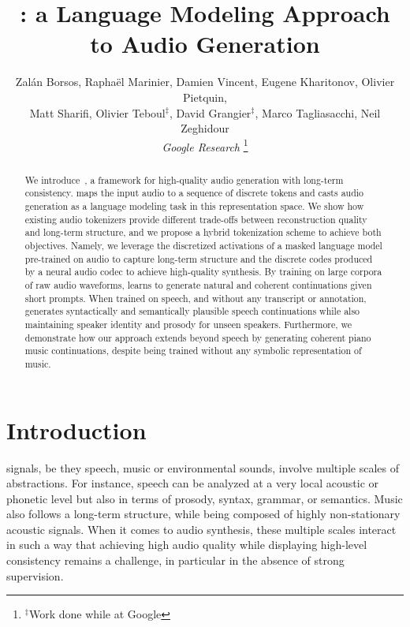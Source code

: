 \documentclass[letterpaper,10 pt]{IEEEtran}
\begin{document}
\title{\ours{}: a Language Modeling Approach to Audio Generation}

\author{Zal\'an Borsos, Rapha\"el Marinier, Damien Vincent, Eugene Kharitonov, Olivier Pietquin,\\Matt Sharifi, Olivier Teboul$^\ddagger$, David Grangier$^\ddagger$, Marco Tagliasacchi, Neil Zeghidour\\
\vspace{3mm}\textit{Google Research}
\thanks{$^\ddagger$Work done while at Google}}


\maketitle

\begin{abstract}
We introduce~\ours{}, a framework for high-quality audio generation with long-term consistency. \ours{} maps the input audio to a sequence of discrete tokens and casts audio generation as a language modeling task in this representation space. We show how existing audio tokenizers provide different trade-offs between reconstruction quality and long-term structure, and we propose a hybrid tokenization scheme to achieve both objectives. Namely, we leverage the discretized activations of a masked language model pre-trained on audio to capture long-term structure and the discrete codes produced by a neural audio codec to achieve high-quality synthesis. By training on large corpora of raw audio waveforms, \ours{} learns to generate natural and coherent continuations given short prompts. When trained on speech, and without any transcript or annotation, \ours{} generates syntactically and semantically plausible speech continuations while also maintaining speaker identity and prosody for unseen speakers. Furthermore, we demonstrate how our approach extends beyond speech by generating coherent piano music continuations, despite being trained without any symbolic representation of music.
\end{abstract}


\section{Introduction}

 signals, be they speech, music or environmental sounds, involve multiple scales of abstractions. For instance, speech can be analyzed at a very local acoustic or phonetic level but also in terms of prosody, syntax, grammar, or semantics. Music also follows a long-term structure, while being composed of highly non-stationary acoustic signals. When it comes to audio synthesis, these multiple scales interact in such a way that achieving high audio quality while displaying high-level consistency remains a challenge, in particular in the absence of strong supervision. 
\end{document}
